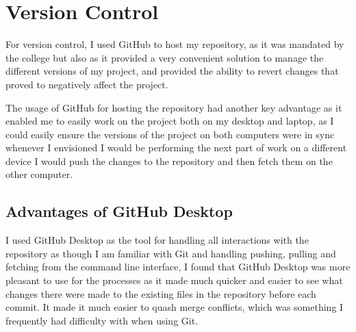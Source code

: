 \section{Version Control}
\par
For version control, I used GitHub to host my repository, as it was mandated by the college but also as it provided a very convenient solution to manage the different versions of my project, and provided the ability to revert changes that proved to negatively affect the project.
\par
The usage of GitHub for hosting the repository had another key advantage as it enabled me to easily work on the project both on my desktop and laptop, as I could easily ensure the versions of the project on both computers were in sync whenever I envisioned I would be performing the next part of work on a different device I would push the changes to the repository and then fetch them on the other computer.
\subsection{Advantages of GitHub Desktop}
\par
I used GitHub Desktop as the tool for handling all interactions with the repository as though I am familiar with Git and handling pushing, pulling and fetching from the command line interface, I found that GitHub Desktop was more pleasant to use for the processes as it made much quicker and easier to see what changes there were made to the existing files in the repository before each commit. It made it much easier to quash merge conflicts, which was something I frequently had difficulty with when using Git.
